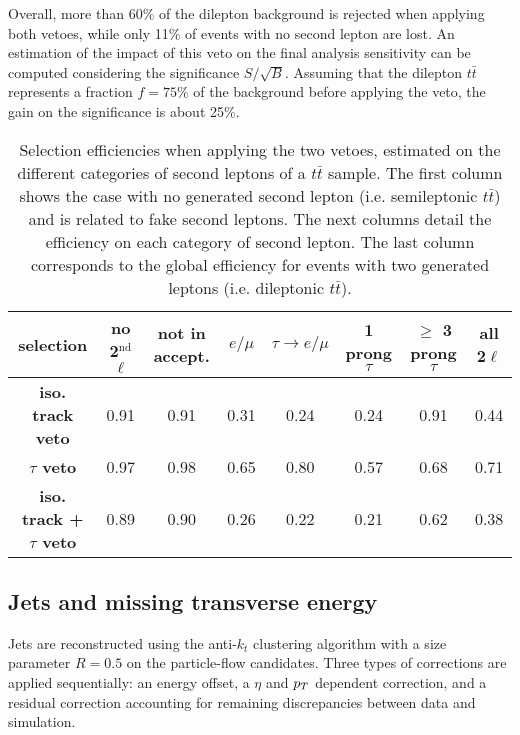     Overall, more than 60\% of the dilepton background is rejected when applying both
    vetoes, while only 11\% of events with no second lepton are lost. An estimation of the
    impact of this veto on the final analysis sensitivity can be computed considering the
    significance $S/\sqrt{B}$. Assuming that the dilepton $t\bar{t}$ represents a fraction
    $f = 75\%$ of the background before applying the veto, the gain on the significance
    is about 25\%.

    \begin{table}
    \hspace*{-1.2cm}
    \begin{tabular}{|c|c|ccccc|c|}
        \hline
        \textbf{selection}                  & no 2$^\text{nd}$ $\ell$ & not in accept. & $e/\mu$ & $\tau \rightarrow e/\mu$ & 1 prong $\tau $ & $\geq$ 3 prong $\tau$ & all 2$\ell$ \\
        \hline
        \textbf{iso. track veto}            & 0.91                    & 0.91  & 0.31  & 0.24  & 0.24  & 0.91  & 0.44  \\
        \textbf{$\tau$ veto}                & 0.97                    & 0.98  & 0.65  & 0.80  & 0.57  & 0.68  & 0.71  \\
        \hline
        \textbf{iso. track + $\tau$ veto}   & 0.89                    & 0.90  & 0.26  & 0.22  & 0.21  & 0.62  & 0.38 \\
        \hline
    \end{tabular}
        \caption{Selection efficiencies when applying the two vetoes, estimated on the different
        categories of second leptons of a $t\bar{t}$ sample. The first column shows
        the case with no generated second lepton (i.e. semileptonic $t\bar{t}$) and is
        related to fake second leptons. The next columns detail the efficiency on each
        category of second lepton. The last column corresponds to the global efficiency
        for events with two generated leptons (i.e. dileptonic $t\bar{t}$).}
        \label{tab:secondLeptonVetoPerformances}
    \end{table}

    \subsection{Jets and missing transverse energy \label{sec:analysisJetMET}}

       Jets are reconstructed using the anti-$k_t$ clustering algorithm with a size
       parameter $R = 0.5$ on the particle-flow candidates. Three types of corrections
       are applied sequentially: an energy offset, a $\eta$ and $p_T$ dependent correction,
       and a residual correction accounting for remaining discrepancies between data and simulation.

